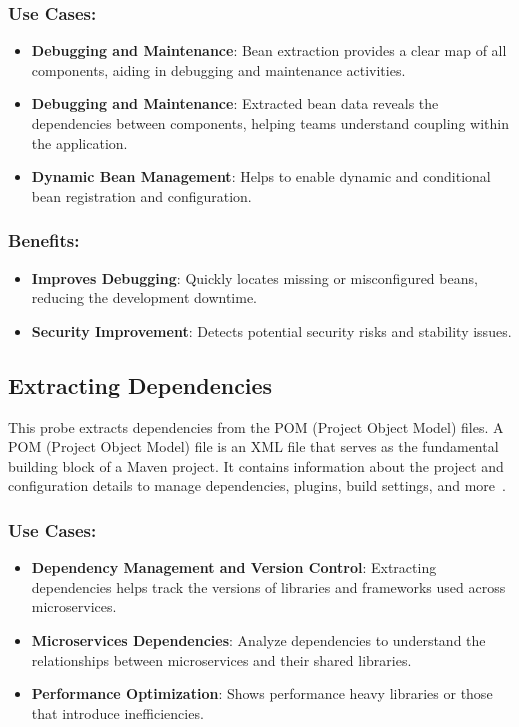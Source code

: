\subsubsection{Use Cases:}
\begin{itemize}[label=$\bullet$]
	\item \textbf{Debugging and Maintenance}: Bean extraction provides a clear map of all components, aiding in debugging and maintenance activities.
	\item \textbf{Debugging and Maintenance}: Extracted bean data reveals the dependencies between components, helping teams understand coupling within the application.
	\item \textbf{Dynamic Bean Management}: Helps to enable dynamic and conditional bean registration and configuration.
\end{itemize}
\subsubsection{Benefits:}
\begin{itemize}[label=$\bullet$]
	\item \textbf{Improves Debugging}: Quickly locates missing or misconfigured beans, reducing the development downtime.
	\item \textbf{Security Improvement}: Detects potential security risks and stability issues.
\end{itemize} 

\subsection{Extracting Dependencies}
This probe extracts dependencies from the POM (Project Object Model) files. A POM (Project Object Model) file is an XML file that serves as the fundamental building block of a Maven project. It contains information about the project and configuration details to manage dependencies, plugins, build settings, and more~\citep{pom_file_guide}.
\subsubsection{Use Cases:}
\begin{itemize}[label=$\bullet$]
	\item \textbf{Dependency Management and Version Control}: Extracting dependencies helps track the versions of libraries and frameworks used across microservices.
	\item \textbf{Microservices Dependencies}: Analyze dependencies to understand the relationships between microservices and their shared libraries.
	\item \textbf{Performance Optimization}: Shows performance heavy libraries or those that introduce inefficiencies.
\end{itemize}
